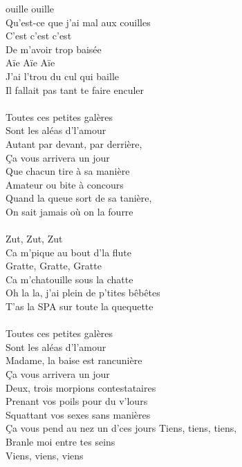 
 ouille ouille
\\Qu'est-ce que j'ai mal aux couilles
\\C'est c'est c'est
\\De m'avoir trop baisée
\\Aïe Aïe Aïe
\\J'ai l'trou du cul qui baille
\\Il fallait pas tant te faire enculer \bissimple
\\\\Toutes ces petites galères
\\Sont les aléas d'l'amour
\\Autant par devant, par derrière,
\\Ça vous arrivera un jour
\\Que chacun tire à sa manière
\\Amateur ou bite à concours
\\Quand la queue sort de sa tanière,
\\On sait jamais où on la fourre
\\\\Zut, Zut, Zut
\\Ca m'pique au bout d'la flute
\\Gratte, Gratte, Gratte
\\Ca m'chatouille sous la chatte
\\Oh la la, j'ai plein de p'tites bêbêtes
\\T'as la SPA sur toute la quequette \bissimple
\\\\Toutes ces petites galères
\\Sont les aléas d'l'amour
\\Madame, la baise est rancunière
\\Ça vous arrivera un jour
\\Deux, trois morpions contestataires
\\Prenant vos poils pour du v'lours
\\Squattant vos sexes sans manières
\\Ça vous pend au nez un d'ces jours
\breakpage
Tiens, tiens, tiens,
\\Branle moi entre tes seins
\\Viens, viens, viens
